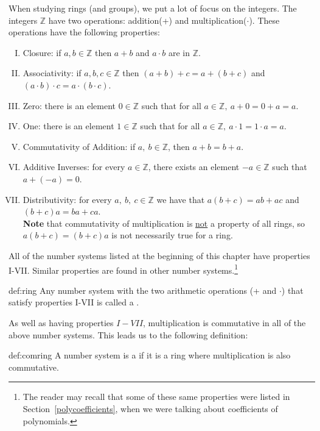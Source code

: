 When studying rings (and groups), we put a lot of focus on the integers.  The integers ${\mathbb Z}$ have two operations: addition(+) and multiplication($\cdot$). These operations have the following properties:
\begin{enumerate}[(I)]
\item Closure: if $a, b \in {\mathbb Z}$ then $a+b$ and $a\cdot b$ are in ${\mathbb Z}$.
\item Associativity: if $a, b, c\in {\mathbb Z}$ then $(a+b)+c=a+(b+c)$ and $(a\cdot b)\cdot c=a\cdot (b\cdot c)$.
\item Zero: there is an element $0\in {\mathbb Z}$ such that for all $a\in {\mathbb Z},~a+0=0+a=a$.
\item One: there is an element $1\in {\mathbb Z}$ such that for all $a\in {\mathbb Z},~a\cdot 1=1\cdot a=a$.
\item Commutativity of Addition: if $a,~b\in {\mathbb Z}$, then $a+b=b+a$. 
\item Additive Inverses: for every $a\in {\mathbb Z}$, there exists an element $-a\in {\mathbb Z}$ such that $a+(-a)=0$.
\item Distributivity: for every $a,~b,~c\in {\mathbb Z}$ we have that $a(b+c)=ab+ac$ and $(b+c)a=ba+ca$.\\

\textbf{Note} that commutativity of multiplication is \underline{not} a property of all  rings, so $a(b+c)=(b+c)a$ is not necessarily true for a ring.
 \end{enumerate}

All of the number systems listed at the beginning of this chapter have properties I-VII.  Similar properties are found in other number systems.\footnote{The reader may recall that some of these same properties were listed in Section~\ref{polycoefficients}, when we were talking about coefficients of polynomials.}

\begin{defn}{def:ring}
Any number system with the two arithmetic operations (+ and $\cdot$) that satisfy properties I-VII is called a .
\end{defn}

As well as having properties $I-VII$, multiplication is commutative in all of the above number systems. This leads us to the following definition:

\begin{defn}{def:comring}
A number system is a  if it is a ring where multiplication is also commutative.
\end{defn}

